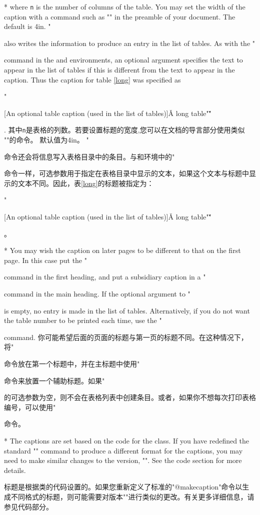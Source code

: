 \begin{paracol}{2}
\switchcolumn[0]*
where \texttt{n} is the number of columns of the table. You may set
the width of the caption with a command such as
"\setlength{\LTcapwidth}{2in}"
in the preamble of your document. The default is 4in. 
"\caption" also
writes the information to produce an entry in the list of tables. As
with the "\caption" command in the  and 
environments, an optional argument specifies the text to appear in the
list of tables if this is different from the text to appear in the
caption. Thus the caption for table \ref{long} was specified as
{\ttfamily
 "\caption"[An optional table caption
            (used in the list of tables)]\v{A long
 table"\label{long}"\v}}.
\switchcolumn%
其中\texttt{n}是表格的列数。若要设置标题的宽度,您可以在文档的导言部分使用类似
"\setlength{\LTcapwidth}{2in}"的命令。
默认值为4in。
"\caption"命令还会将信息写入表格目录中的条目。与和环境中的"\caption"命令一样，可选参数用于指定在表格目录中显示的文本，如果这个文本与标题中显示的文本不同。因此，表\ref{long}的标题被指定为：{\ttfamily
"\caption"[An optional table caption
           (used in the list of tables)]\v{A long
table"\label{long}"\v}}。

\switchcolumn[0]*
You may wish the caption on later pages to be different to that on the
first page. In this case put the "\caption" command in the first
heading, and put a subsidiary caption in a "\caption[]" command in
the main heading. If the optional argument to "\caption" is empty,
no entry is made in the list of tables. Alternatively, if you do not
want the table number to be printed each time, use the "\caption*"
command.\switchcolumn 
你可能希望后面的页面的标题与第一页的标题不同。在这种情况下，将"\caption"命令放在第一个标题中，并在主标题中使用"\caption[]"命令来放置一个辅助标题。如果"\caption"的可选参数为空，则不会在表格列表中创建条目。或者，如果你不想每次打印表格编号，可以使用"\caption*"命令。

\switchcolumn[0]*
The captions are set based on the code for the 
class.
If you have redefined the standard "\@makecaption" command to produce
a different format for the captions, you may
need to make similar changes to the  version,
"\LT@makecaption". See the code section for more details.\switchcolumn 

标题是根据类的代码设置的。如果您重新定义了标准的"@makecaption"命令以生成不同格式的标题，则可能需要对版本"\LT@makecaption"进行类似的更改。有关更多详细信息，请参见代码部分。


\end{paracol}
